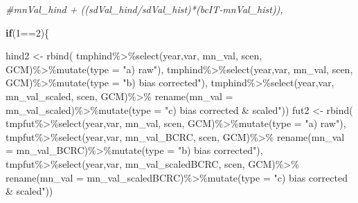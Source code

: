 \documentclass[
]{article}
\newenvironment{Shaded}{\begin{snugshade}}{\end{snugshade}}
\newcommand{\AttributeTok}[1]{\textcolor[rgb]{0.77,0.63,0.00}{#1}}
\newcommand{\CommentTok}[1]{\textcolor[rgb]{0.56,0.35,0.01}{\textit{#1}}}
\newcommand{\ControlFlowTok}[1]{\textcolor[rgb]{0.13,0.29,0.53}{\textbf{#1}}}
\newcommand{\DecValTok}[1]{\textcolor[rgb]{0.00,0.00,0.81}{#1}}
\newcommand{\FunctionTok}[1]{\textcolor[rgb]{0.00,0.00,0.00}{#1}}
\newcommand{\NormalTok}[1]{#1}
\newcommand{\OtherTok}[1]{\textcolor[rgb]{0.56,0.35,0.01}{#1}}
\newcommand{\SpecialCharTok}[1]{\textcolor[rgb]{0.00,0.00,0.00}{#1}}
\newcommand{\StringTok}[1]{\textcolor[rgb]{0.31,0.60,0.02}{#1}}
\begin{document}
\begin{Shaded}
\begin{Highlighting}[]
\CommentTok{\#mnVal\_hind + ((sdVal\_hind/sdVal\_hist)*(bcIT{-}mnVal\_hist)),}
       
       \ControlFlowTok{if}\NormalTok{(}\DecValTok{1}\SpecialCharTok{==}\DecValTok{2}\NormalTok{)\{}
         
\NormalTok{          hind2 }\OtherTok{\textless{}{-}} \FunctionTok{rbind}\NormalTok{(}
\NormalTok{            tmphind}\SpecialCharTok{\%\textgreater{}\%}\FunctionTok{select}\NormalTok{(year,var, mn\_val, scen, GCM)}\SpecialCharTok{\%\textgreater{}\%}\FunctionTok{mutate}\NormalTok{(}\AttributeTok{type =} \StringTok{"a) raw"}\NormalTok{),}
\NormalTok{            tmphind}\SpecialCharTok{\%\textgreater{}\%}\FunctionTok{select}\NormalTok{(year,var, mn\_val, scen, GCM)}\SpecialCharTok{\%\textgreater{}\%}\FunctionTok{mutate}\NormalTok{(}\AttributeTok{type =} \StringTok{"b) bias corrected"}\NormalTok{),}
\NormalTok{            tmphind}\SpecialCharTok{\%\textgreater{}\%}\FunctionTok{select}\NormalTok{(year,var, mn\_val\_scaled, scen, GCM)}\SpecialCharTok{\%\textgreater{}\%}
              \FunctionTok{rename}\NormalTok{(}\AttributeTok{mn\_val =}\NormalTok{ mn\_val\_scaled)}\SpecialCharTok{\%\textgreater{}\%}\FunctionTok{mutate}\NormalTok{(}\AttributeTok{type =} \StringTok{"c) bias corrected \&  scaled"}\NormalTok{))}
\NormalTok{          fut2 }\OtherTok{\textless{}{-}} \FunctionTok{rbind}\NormalTok{(}
\NormalTok{            tmpfut}\SpecialCharTok{\%\textgreater{}\%}\FunctionTok{select}\NormalTok{(year,var, mn\_val, scen, GCM)}\SpecialCharTok{\%\textgreater{}\%}\FunctionTok{mutate}\NormalTok{(}\AttributeTok{type =} \StringTok{"a) raw"}\NormalTok{),}
\NormalTok{            tmpfut}\SpecialCharTok{\%\textgreater{}\%}\FunctionTok{select}\NormalTok{(year,var, mn\_val\_BCRC, scen, GCM)}\SpecialCharTok{\%\textgreater{}\%}
              \FunctionTok{rename}\NormalTok{(}\AttributeTok{mn\_val =}\NormalTok{ mn\_val\_BCRC)}\SpecialCharTok{\%\textgreater{}\%}\FunctionTok{mutate}\NormalTok{(}\AttributeTok{type =} \StringTok{"b) bias corrected"}\NormalTok{),}
\NormalTok{            tmpfut}\SpecialCharTok{\%\textgreater{}\%}\FunctionTok{select}\NormalTok{(year,var, mn\_val\_scaledBCRC, scen, GCM)}\SpecialCharTok{\%\textgreater{}\%}
              \FunctionTok{rename}\NormalTok{(}\AttributeTok{mn\_val =}\NormalTok{ mn\_val\_scaledBCRC)}\SpecialCharTok{\%\textgreater{}\%}\FunctionTok{mutate}\NormalTok{(}\AttributeTok{type =} \StringTok{"c) bias corrected \&  scaled"}\NormalTok{))}
         

\end{Highlighting}
\end{Shaded}
\end{document}
